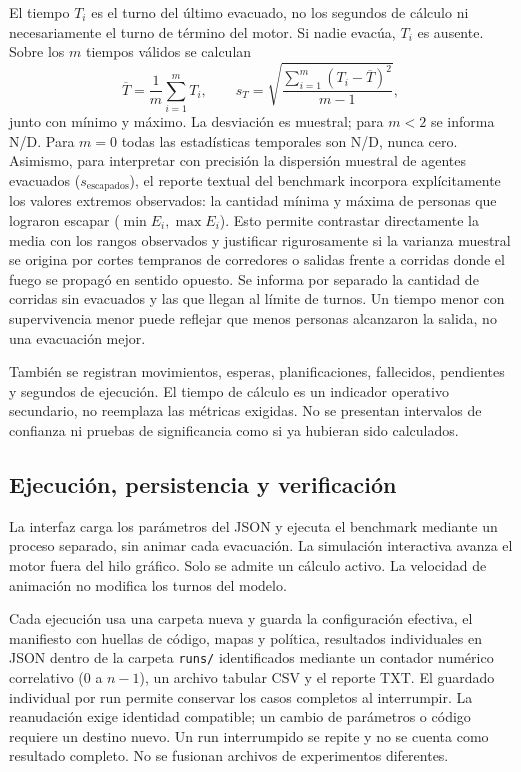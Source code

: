 \documentclass[11pt,letterpaper]{article}
\begin{document}
El tiempo $T_i$ es el turno del último evacuado, no los segundos de cálculo ni necesariamente el turno de término del motor. Si nadie evacúa, $T_i$ es ausente. Sobre los $m$ tiempos válidos se calculan
\[
\overline{T}=\frac{1}{m}\sum_{i=1}^{m}T_i,
\qquad
s_T=\sqrt{\frac{\sum_{i=1}^{m}(T_i-\overline{T})^2}{m-1}},
\]
junto con mínimo y máximo. La desviación es muestral; para $m<2$ se informa N/D. Para $m=0$ todas las estadísticas temporales son N/D, nunca cero. Asimismo, para interpretar con precisión la dispersión muestral de agentes evacuados ($s_{\text{escapados}}$), el reporte textual del benchmark incorpora explícitamente los valores extremos observados: la cantidad mínima y máxima de personas que lograron escapar ($\min E_i, \max E_i$). Esto permite contrastar directamente la media con los rangos observados y justificar rigurosamente si la varianza muestral se origina por cortes tempranos de corredores o salidas frente a corridas donde el fuego se propagó en sentido opuesto. Se informa por separado la cantidad de corridas sin evacuados y las que llegan al límite de turnos. Un tiempo menor con supervivencia menor puede reflejar que menos personas alcanzaron la salida, no una evacuación mejor.

También se registran movimientos, esperas, planificaciones, fallecidos, pendientes y segundos de ejecución. El tiempo de cálculo es un indicador operativo secundario, no reemplaza las métricas exigidas. No se presentan intervalos de confianza ni pruebas de significancia como si ya hubieran sido calculados.

\subsection{Ejecución, persistencia y verificación}
La interfaz carga los parámetros del JSON y ejecuta el benchmark mediante un proceso separado, sin animar cada evacuación. La simulación interactiva avanza el motor fuera del hilo gráfico. Solo se admite un cálculo activo. La velocidad de animación no modifica los turnos del modelo.

Cada ejecución usa una carpeta nueva y guarda la configuración efectiva, el manifiesto con huellas de código, mapas y política, resultados individuales en JSON dentro de la carpeta \texttt{runs/} identificados mediante un contador numérico correlativo ($0$ a $n-1$), un archivo tabular CSV y el reporte TXT. El guardado individual por run permite conservar los casos completos al interrumpir. La reanudación exige identidad compatible; un cambio de parámetros o código requiere un destino nuevo. Un run interrumpido se repite y no se cuenta como resultado completo. No se fusionan archivos de experimentos diferentes.
\end{document}
